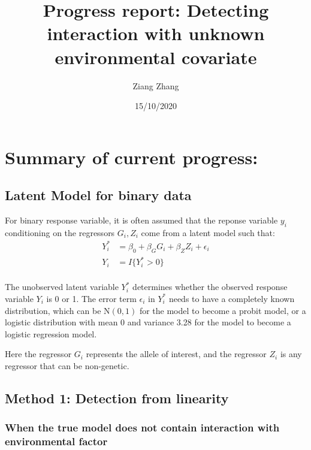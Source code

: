 \documentclass[]{article}
\title{Progress report: Detecting interaction with unknown environmental
covariate}
\author{Ziang Zhang}
\date{15/10/2020}
\begin{document}
\maketitle

\hypertarget{summary-of-current-progress}{%
\section{Summary of current
progress:}\label{summary-of-current-progress}}

\hypertarget{latent-model-for-binary-data}{%
\subsection{Latent Model for binary
data}\label{latent-model-for-binary-data}}

For binary response variable, it is often assumed that the reponse
variable \(y_i\) conditioning on the regressors \(G_i,Z_i\) come from a
latent model such that: \begin{equation}\label{eqn:latentformulation}
\begin{aligned}
Y_i^* &= \beta_0 + \beta_G G_i + \beta_Z Z_i + \epsilon_i \\
Y_i &= I\{Y_i^*>0\} \\
\end{aligned}
\end{equation}

The unobserved latent variable \(Y_i^*\) determines whether the observed
response variable \(Y_i\) is 0 or 1. The error term \(\epsilon_i\) in
\(Y_i^*\) needs to have a completely known distribution, which can be
\(\text{N}(0,1)\) for the model to become a probit model, or a logistic
distribution with mean 0 and variance 3.28 for the model to become a
logistic regression model.

Here the regressor \(G_i\) represents the allele of interest, and the
regressor \(Z_i\) is any regressor that can be non-genetic.

\hypertarget{method-1-detection-from-linearity}{%
\subsection{Method 1: Detection from
linearity}\label{method-1-detection-from-linearity}}

\hypertarget{when-the-true-model-does-not-contain-interaction-with-environmental-factor}{%
\subsubsection{When the true model does not contain interaction with
environmental
factor}\label{when-the-true-model-does-not-contain-interaction-with-environmental-factor}}
\end{document}

